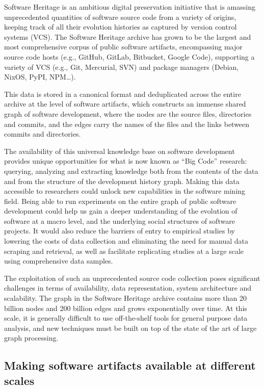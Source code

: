 Software Heritage is an ambitious digital preservation initiative that is
amassing unprecedented quantities of software source code from a variety of
origins, keeping track of all their evolution histories as captured by version
control systems (VCS). The Software Heritage archive has grown to be the
largest and most comprehensive corpus of public software artifacts,
encompassing major source code hosts (e.g., GitHub, GitLab, Bitbucket,
Google Code), supporting a variety of VCS (e.g., Git, Mercurial, SVN) and
package managers (Debian, NixOS, PyPI, NPM…).

This data is stored in a canonical format and deduplicated across the entire
archive at the level of software artifacts, which constructs an immense shared
graph of software development, where the nodes are the source files,
directories and commits, and the edges carry the names of the files and the
links between commits and directories.

The availability of this universal knowledge base on software development
provides unique opportunities for what is now known as “Big Code” research:
querying, analyzing and extracting knowledge both from the contents of the data
and from the structure of the development history graph.
Making this data accessible to researchers could unlock new capabilities in the
software mining field. Being able to run experiments on the entire graph of
public software development could help us gain a deeper understanding of the
evolution of software at a macro level, and the underlying social structures of
software projects. It would also reduce the barriers of entry to empirical
studies by lowering the costs of data collection and eliminating the need for
manual data scraping and retrieval, as well as facilitate replicating studies
at a large scale using comprehensive data samples.

The exploitation of such an unprecedented source code collection poses
significant challenges in terms of availability, data representation, system
architecture and scalability. The graph in the Software Heritage archive
contains more than 20 billion nodes and 200 billion edges and grows
exponentially over time. At this scale, it is generally difficult to use
off-the-shelf tools for general purpose data analysis, and new techniques must
be built on top of the state of the art of large graph processing.

\subsection*{Making software artifacts available at different scales}


